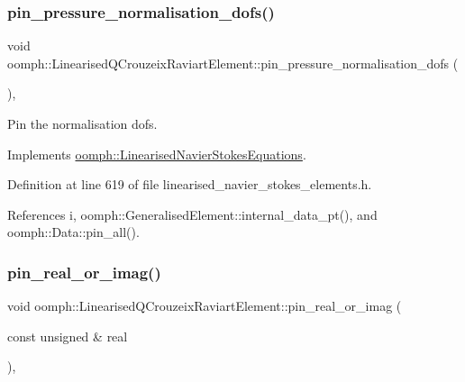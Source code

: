\subsubsection{\texorpdfstring{pin\+\_\+pressure\+\_\+normalisation\+\_\+dofs()}{pin\_pressure\_normalisation\_dofs()}}
{\footnotesize\ttfamily void oomph\+::\+Linearised\+Q\+Crouzeix\+Raviart\+Element\+::pin\+\_\+pressure\+\_\+normalisation\+\_\+dofs (\begin{DoxyParamCaption}{ }\end{DoxyParamCaption})\hspace{0.3cm}{\ttfamily [inline]}, {\ttfamily [virtual]}}



Pin the normalisation dofs. 



Implements \hyperlink{classoomph_1_1LinearisedNavierStokesEquations_a811cc53be5ee3239d31185b6264584f6}{oomph\+::\+Linearised\+Navier\+Stokes\+Equations}.



Definition at line 619 of file linearised\+\_\+navier\+\_\+stokes\+\_\+elements.\+h.



References i, oomph\+::\+Generalised\+Element\+::internal\+\_\+data\+\_\+pt(), and oomph\+::\+Data\+::pin\+\_\+all().

\mbox{\label{classoomph_1_1LinearisedQCrouzeixRaviartElement_ab6ffe74e04be87be8e1fdf6a58215edb}} 
\subsubsection{\texorpdfstring{pin\+\_\+real\+\_\+or\+\_\+imag()}{pin\_real\_or\_imag()}}
{\footnotesize\ttfamily void oomph\+::\+Linearised\+Q\+Crouzeix\+Raviart\+Element\+::pin\+\_\+real\+\_\+or\+\_\+imag (\begin{DoxyParamCaption}\item[{const unsigned \&}]{real }\end{DoxyParamCaption})\hspace{0.3cm}{\ttfamily [inline]}, {\ttfamily [virtual]}}



